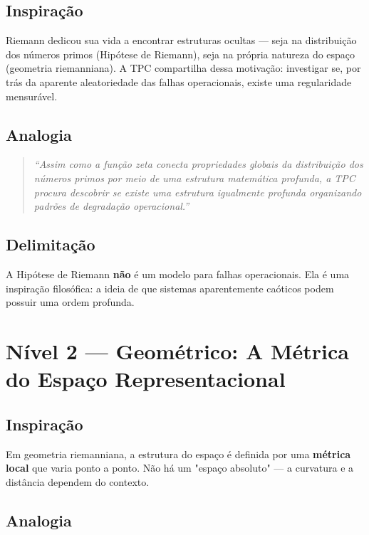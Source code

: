 \documentclass[12pt,a4paper]{article}
\begin{document}
\subsection{Inspiração}

Riemann dedicou sua vida a encontrar estruturas ocultas — seja na distribuição dos números primos (Hipótese de Riemann), seja na própria natureza do espaço (geometria riemanniana). A TPC compartilha dessa motivação: investigar se, por trás da aparente aleatoriedade das falhas operacionais, existe uma regularidade mensurável.

\subsection{Analogia}

\begin{quote}
\emph{``Assim como a função zeta conecta propriedades globais da distribuição dos números primos por meio de uma estrutura matemática profunda, a TPC procura descobrir se existe uma estrutura igualmente profunda organizando padrões de degradação operacional.''}
\end{quote}

\subsection{Delimitação}

A Hipótese de Riemann \textbf{não} é um modelo para falhas operacionais. Ela é uma inspiração filosófica: a ideia de que sistemas aparentemente caóticos podem possuir uma ordem profunda.

\section{Nível 2 — Geométrico: A Métrica do Espaço Representacional}

\subsection{Inspiração}

Em geometria riemanniana, a estrutura do espaço é definida por uma \textbf{métrica local} que varia ponto a ponto. Não há um "espaço absoluto" — a curvatura e a distância dependem do contexto.

\subsection{Analogia}
\end{document}
